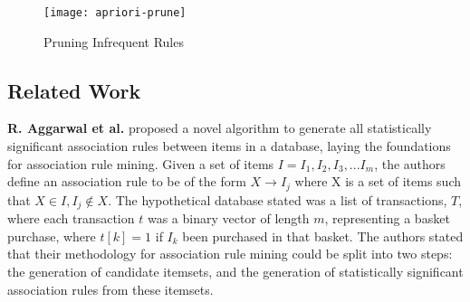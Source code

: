 \documentclass[a4paper,11pt]{article}
\begin{document}
\begin{figure}[H]\centering
\texttt{[image: apriori-prune]}
\caption{Pruning Infrequent Rules}
\label{fig:prune}
\end{figure}

\subsection{Related Work}
\label{related-work}
\textbf{R. Aggarwal et al.} \cite{mine} proposed a novel algorithm to generate all statistically significant association rules between items in a database, laying the foundations for association rule mining.  Given a set of items $I = I_1, I_2, I_3,...I_m$, the authors define an association rule to be of the form $X \rightarrow I_j$ where X is a set of items such that $X \in I, I_j \notin X$.  The hypothetical database stated was a list of transactions, $T$, where each transaction $t$ was a binary vector of length $m$, representing a basket purchase, where $t[k] = 1$ if $I_k$ been purchased in that basket.  The authors stated that their methodology for association rule mining could be split into two steps: the generation of candidate itemsets, and the generation of statistically significant association rules from these itemsets. \\
\end{document}
